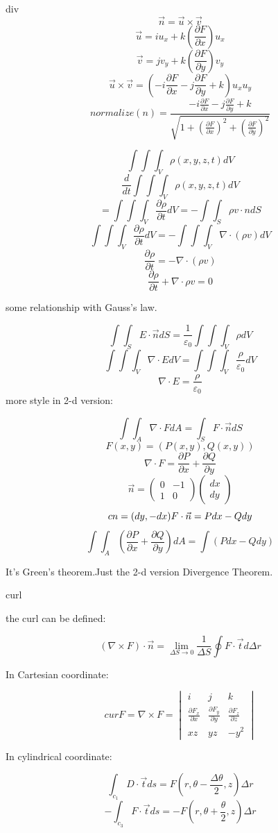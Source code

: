 \documentclass[10pt,a4paper]{article}
\begin{document}
div
\[\vec{n}=\vec{u}\times\vec{v}\]
\[\vec{u}=iu_x+k(\frac{\partial F}{\partial x})u_x\]
\[\vec{v}=jv_y+k(\frac{\partial F}{\partial y})v_y\]
\[\vec{u}\times\vec{v}=(-i\frac{\partial F}{\partial x}-j\frac{\partial F}{\partial y}+k)u_xu_y\]
\[normalize(n)=\frac{-i\frac{\partial F}{\partial x}-j\frac{\partial F}{\partial y}+k}{\sqrt{1+(\frac{\partial F}{\partial x})^2+ (\frac{\partial F}{\partial y})^2}}\]

\[\int\int\int_V\rho(x,y,z,t)dV\]
\[\frac{d}{dt}\int\int\int_V\rho(x,y,z,t)dV\]
\[=\int\int\int_V\frac{\partial \rho}{\partial t}dV=-\int\int_S\rho v\cdot ndS\]
\[\int\int\int_V\frac{\partial\rho}{\partial t}dV=-\int\int\int_V\nabla\cdot(\rho v)dV\]
\[\frac{\partial\rho}{\partial t}=-\nabla\cdot(\rho v)\]
\[\frac{\partial\rho}{\partial t}+\nabla\cdot\rho v=0\]

some relationship with Gauss's law.

\[\int\int_SE\cdot\vec{n}dS=\frac{1}{\varepsilon_0}\int\int\int_V\rho dV\]
\[\int\int\int_V\nabla\cdot EdV=\int\int\int_V\frac{\rho}{\varepsilon_0}dV\]
\[\nabla\cdot E=\frac{\rho}{\varepsilon_0}\]
more style in 2-d version:

\[\int\int_A\nabla\cdot FdA=\int_SF\cdot\vec{n}dS\]
\[F(x,y)=(P(x,y),Q(x,y))\]
\[\nabla\cdot F=\frac{\partial P}{\partial x}+\frac{\partial Q}{\partial y}\]
\[\vec{n}=\begin{pmatrix}0&-1\\1&0\end{pmatrix}\begin{pmatrix}dx\\dy\end{pmatrix}\]
\[c{n}=(dy,-dx)\\[10pt]F\cdot\vec{n}=Pdx-Qdy\]
\[\int\int_A(\frac{\partial P}{\partial x}+\frac{\partial Q}{\partial y})dA=\int(Pdx-Qdy)\]

It's Green's theorem.Just the 2-d version Divergence Theorem.

curl

the curl can be defined:

\[(\nabla\times F)\cdot\vec{n}=\lim_{\Delta S\to0}\frac{1}{\Delta S}\oint F\cdot\vec{t}d\Delta r\]

In Cartesian coordinate:

\[cur F=\nabla\times F=\begin{vmatrix}i&j&k\\\frac{\partial F_x}{\partial x}&\frac{\partial F_y}{\partial y}&\frac{\partial F_z}{\partial z}\\xz&yz&-y^2\end{vmatrix}\]

In cylindrical coordinate:

\[\int_{c_1}D\cdot\vec{t}ds=F(r,\theta-\frac{\Delta\theta}{2},z)\Delta r\]
\[-\int_{c_3}F\cdot\vec{t}ds=-F(r,\theta+\frac{\theta}{2},z)\Delta r\]
\end{document}
